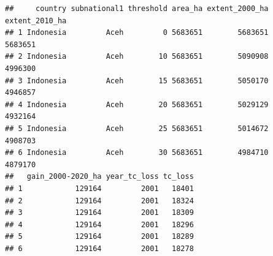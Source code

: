 \documentclass[
]{article}
\newenvironment{Shaded}{\begin{snugshade}}{\end{snugshade}}
\newcommand{\CommentTok}[1]{\textcolor[rgb]{0.56,0.35,0.01}{\textit{#1}}}
\newcommand{\FunctionTok}[1]{\textcolor[rgb]{0.13,0.29,0.53}{\textbf{#1}}}
\newcommand{\NormalTok}[1]{#1}
\newcommand{\OtherTok}[1]{\textcolor[rgb]{0.56,0.35,0.01}{#1}}
\newcommand{\SpecialCharTok}[1]{\textcolor[rgb]{0.81,0.36,0.00}{\textbf{#1}}}
\newcommand{\StringTok}[1]{\textcolor[rgb]{0.31,0.60,0.02}{#1}}
\begin{document}
\begin{Shaded}
\end{Shaded}

\begin{verbatim}
##     country subnational1 threshold area_ha extent_2000_ha extent_2010_ha
## 1 Indonesia         Aceh         0 5683651        5683651        5683651
## 2 Indonesia         Aceh        10 5683651        5090908        4996300
## 3 Indonesia         Aceh        15 5683651        5050170        4946857
## 4 Indonesia         Aceh        20 5683651        5029129        4932164
## 5 Indonesia         Aceh        25 5683651        5014672        4908703
## 6 Indonesia         Aceh        30 5683651        4984710        4879170
##   gain_2000-2020_ha year_tc_loss tc_loss
## 1            129164         2001   18401
## 2            129164         2001   18324
## 3            129164         2001   18309
## 4            129164         2001   18296
## 5            129164         2001   18289
## 6            129164         2001   18278
\end{verbatim}
\end{document}
